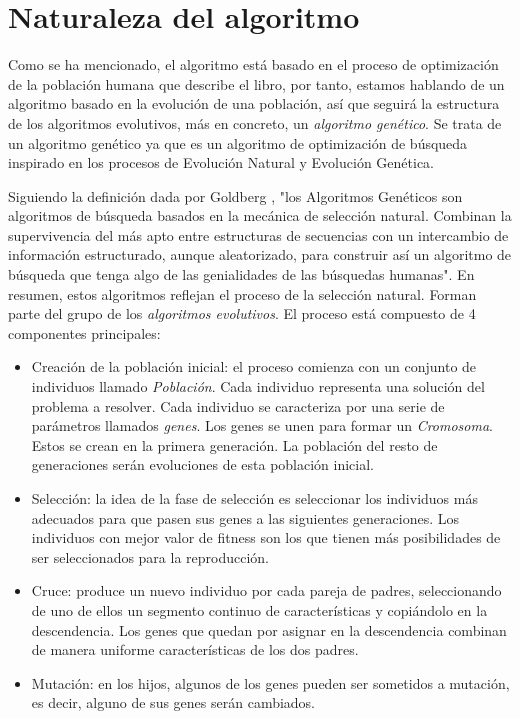 \section{Naturaleza del algoritmo}

Como se ha mencionado, el algoritmo está basado en el proceso de optimización de la población humana que describe el libro, por tanto,
estamos hablando de un algoritmo basado en la evolución de una población, así que seguirá
la estructura de los algoritmos evolutivos, más en concreto, un \emph{algoritmo genético}. Se trata de un algoritmo 
genético ya que es un algoritmo de optimización de búsqueda inspirado en los procesos de Evolución Natural y
Evolución Genética.

Siguiendo la definición dada por Goldberg \cite{goldberg89}, "los Algoritmos Genéticos son algoritmos de búsqueda
basados en la mecánica de selección natural. Combinan la supervivencia del más apto entre estructuras de secuencias con un intercambio de 
información estructurado, aunque aleatorizado, para construir así un algoritmo de búsqueda que tenga algo de las genialidades de las 
búsquedas humanas". En resumen, estos algoritmos reflejan el proceso de la selección natural. Forman parte del grupo de 
los \emph{algoritmos evolutivos}. El proceso está compuesto de 4 componentes principales:

\begin{itemize}
    \item Creación de la población inicial: el proceso comienza con un conjunto de individuos llamado \emph{Población}. Cada individuo
    representa una solución del problema a resolver. Cada individuo se caracteriza por una serie de parámetros llamados
    \emph{genes}. Los genes se unen para formar un \emph{Cromosoma}. Estos se crean en la primera generación. La población del 
    resto de generaciones serán evoluciones de esta población inicial.
    \item Selección: la idea de la fase de selección es seleccionar los individuos más adecuados para que pasen sus
    genes a las siguientes generaciones. Los individuos con mejor valor de fitness son los que tienen más posibilidades
    de ser seleccionados para la reproducción.
    \item Cruce: produce un nuevo individuo por cada pareja de padres, seleccionando de uno de ellos un segmento
    continuo de características y copiándolo en la descendencia. Los genes que quedan por asignar en la descendencia
    combinan de manera uniforme características de los dos padres.
    \item Mutación: en los hijos, algunos de los genes pueden ser sometidos a mutación, es decir, alguno de sus genes
    serán cambiados.
\end{itemize}

